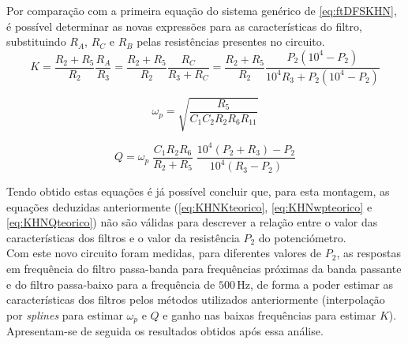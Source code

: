\documentclass[a4paper,11pt]{report}
\begin{document}
Por comparação com a primeira equação do sistema genérico de \ref{eq:ftDFSKHN}, é possível determinar as novas expressões para as características do filtro, substituindo $R_A$, $R_C$ e $R_B$ pelas resistências presentes no circuito.
\begin{equation}
K=\dfrac{R_2+R_5}{R_2}\dfrac{R_A}{R_3}=\dfrac{R_2+R_5}{R_2}\dfrac{R_C}{R_3+R_C}=\dfrac{R_2+R_5}{R_2}\dfrac{P_2(10^4-P_2)}{10^4R_3+P_2(10^4-P_2)}
\end{equation}

\begin{equation}
\omega_p=\sqrt{\dfrac{R_5}{C_1C_2R_2R_6R_{11}}}
\end{equation}

\begin{equation}
Q=\omega_p\;\dfrac{C_1R_2R_6}{R_2+R_5}\;\dfrac{10^4(P_2+R_3)-P_2}{10^4(R_3-P_2)}
\end{equation}

Tendo obtido estas equações é já possível concluir que, para esta montagem, as equações deduzidas anteriormente (\ref{eq:KHNKteorico}, \ref{eq:KHNwpteorico} e \ref{eq:KHNQteorico}) não são válidas para descrever a relação entre o valor das características dos filtros e o valor da resistência $P_2$ do potenciómetro.\\

Com este novo circuito foram medidas, para diferentes valores de $P_2$, as respostas em frequência do filtro passa-banda para frequências próximas da banda passante e do filtro passa-baixo para a frequência de $500\, \textrm{Hz}$, de forma a poder estimar as características dos filtros pelos métodos utilizados anteriormente (interpolação por \textit{splines} para estimar $\omega_p$ e $Q$ e ganho nas baixas frequências para estimar $K$). Apresentam-se de seguida os resultados obtidos após essa análise.
\end{document}
